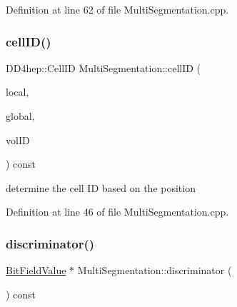 Definition at line 62 of file Multi\+Segmentation.\+cpp.

\hypertarget{class_d_d4hep_1_1_geometry_1_1_multi_segmentation_a45e00a1c691bffc87fed338dc2470717}{}\label{class_d_d4hep_1_1_geometry_1_1_multi_segmentation_a45e00a1c691bffc87fed338dc2470717} 
\subsubsection{\texorpdfstring{cell\+I\+D()}{cellID()}}
{\footnotesize\ttfamily D\+D4hep\+::\+Cell\+ID Multi\+Segmentation\+::cell\+ID (\begin{DoxyParamCaption}\item[{const \hyperlink{namespace_d_d4hep_1_1_geometry_a55083902099d03506c6db01b80404900}{Position} \&}]{local,  }\item[{const \hyperlink{namespace_d_d4hep_1_1_geometry_a55083902099d03506c6db01b80404900}{Position} \&}]{global,  }\item[{const Volume\+ID \&}]{vol\+ID }\end{DoxyParamCaption}) const}



determine the cell ID based on the position 



Definition at line 46 of file Multi\+Segmentation.\+cpp.

\hypertarget{class_d_d4hep_1_1_geometry_1_1_multi_segmentation_a8467d1730b8d5429b7fe4c8da6e04bd6}{}\label{class_d_d4hep_1_1_geometry_1_1_multi_segmentation_a8467d1730b8d5429b7fe4c8da6e04bd6} 
\subsubsection{\texorpdfstring{discriminator()}{discriminator()}}
{\footnotesize\ttfamily \hyperlink{class_d_d4hep_1_1_d_d_segmentation_1_1_bit_field_value}{Bit\+Field\+Value} $\ast$ Multi\+Segmentation\+::discriminator (\begin{DoxyParamCaption}{ }\end{DoxyParamCaption}) const}



